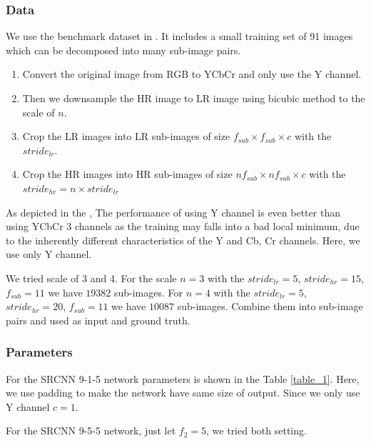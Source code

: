 \documentclass[12pt,journal,compsoc]{IEEEtran}
\begin{document}
\subsubsection{Data}
We use the benchmark dataset in \cite{DBLP:journals/corr/DongLHT15}. It includes a small training set of 91 images which can be decomposed into many sub-image pairs. 
\begin{enumerate}
  \item Convert the original image from RGB to YCbCr and only use the Y channel.
  \item Then we downsample the HR image to LR image using bicubic method to the scale of $n$.
  \item Crop the LR images into LR sub-images of size $f_{sub} \times f_{sub} \times c$ with the $stride_{lr}$.
  \item Crop the HR images into HR sub-images of size $nf_{sub} \times nf_{sub} \times c$ with the $stride_{hr} = n \times stride_{lr}$
\end{enumerate}
As depicted in the \cite{DBLP:journals/corr/DongLHT15}, The performance of using Y channel is even better than using YCbCr 3 channels as the training may falls into a bad local minimum, due to the inherently different characteristics of the Y and Cb, Cr channels. Here, we use only Y channel.

We tried scale of 3 and 4. For the scale $n = 3$ with the $stride_{lr} = 5$, $stride_{hr} = 15$, $f_{sub} = 11$ we have $19382$ sub-images.
For $n = 4$ with the $stride_{lr} = 5$, $stride_{hr} = 20$,  $f_{sub} = 11$ we have $10087$ sub-images. 
Combine them into sub-image pairs and used as input and ground truth.

\subsubsection{Parameters}
For the SRCNN 9-1-5 network parameters is shown in the Table \ref{table_1}. Here, we use padding to make the network have same size of output. Since we only use Y channel $c = 1$.

For the SRCNN 9-5-5 network, just let $f_2 = 5$, we tried both setting.
\end{document}
